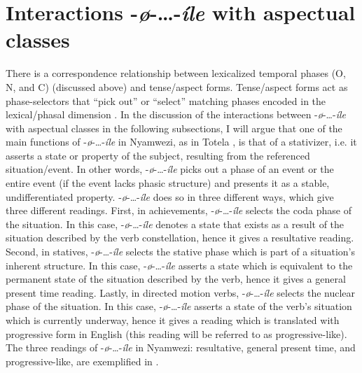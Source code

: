 \documentclass[output=paper]{langscibook}
\begin{document}
\section{Interactions -\textit{ø}-…-\textit{íle} with aspectual classes}

\label{sec:kanijo:4}

There is a correspondence relationship between lexicalized temporal phases (O, N, and C) (discussed above) and tense/aspect forms. Tense/aspect forms act as phase-selectors that “pick out” or “select” matching phases encoded in the lexical/phasal dimension \citep[223]{Sasse2002}. In the discussion of the interactions between -\textit{ø}-…-\textit{íle} with aspectual classes in the following subsections, I will argue that one of the main functions of -\textit{ø}-…-\textit{íle} in Nyamwezi, as in Totela \citep{Crane2013}, is that of a stativizer, i.e. it asserts a state or property of the subject, resulting from the referenced situation/event. In other words, -\textit{ø}-…-\textit{íle} picks out a phase of an event or the entire event (if the event lacks phasic structure) and presents it as a stable, undifferentiated property. -\textit{ø}-…-\textit{íle} does so in three different ways, which give three different readings. First, in achievements, -\textit{ø}-…-\textit{íle} selects the coda phase of the situation. In this case, -\textit{ø}-…-\textit{íle} denotes a state that exists as a result of the situation described by the verb constellation, hence it gives a resultative reading. Second, in statives, -\textit{ø}-…-\textit{íle} selects the stative phase which is part of a situation’s inherent structure. In this case, -\textit{ø}-…-\textit{íle} asserts a state which is equivalent to the permanent state of the situation described by the verb, hence it gives a general present time reading. Lastly, in directed motion verbs, -\textit{ø}-…-\textit{íle} selects the nuclear phase of the situation. In this case, -\textit{ø}-…-\textit{íle} asserts a state of the verb’s situation which is currently underway, hence it gives a reading which is translated with progressive form in English (this reading will be referred to as progressive-like). The three readings of -\textit{ø}-…-\textit{íle} in Nyamwezi: resultative, general present time, and progressive-like, are exemplified in . 
\end{document}
